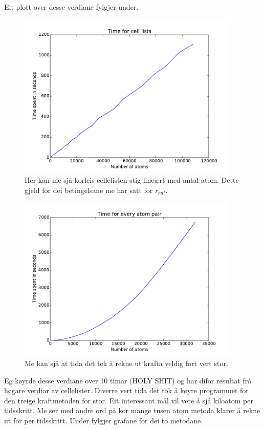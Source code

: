 \documentclass[12pt, a4paper]{article}
\theoremstyle{definition} \newtheorem*{definition}{Teorem}
\begin{document}
        Eit plott over desse verdiane fylgjer under.
        \begin{figure}[H]
            \centering
            \includegraphics[width=400px]{cellListsTime.pdf}
            \caption{Her kan me sjå korleis cellelisten stig lineært med antal atom. Dette gjeld for dei betingelsane me har satt for $r_{cut}$.}
        \end{figure}

        \begin{figure}[H]
            \centering
            \includegraphics[width=400px]{oldForceTime.pdf}
            \caption{Me kan sjå at tida det tek å rekne ut krafta veldig fort vert stor.}
        \end{figure}
        Eg køyrde desse verdiane over 10 timar (HOLY SHIT) og har difor resultat frå høgare verdiar av cellelister. Diverre vert tida det tok å køyre programmet for den treige kraftmetoden
        for stor. Eit interessant mål vil vere å sjå kiloatom per tidsskritt. Me ser med andre ord på kor mange tusen atom metoda klarer å rekne ut for per tidsskritt. Under 
        fylgjer grafane for dei to metodane.
\end{document}

